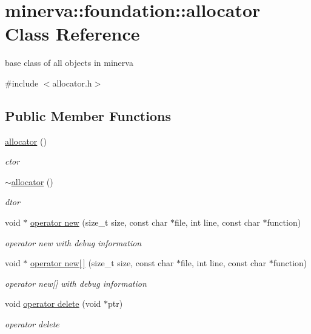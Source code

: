 \hypertarget{classminerva_1_1foundation_1_1allocator}{}\section{minerva\+:\+:foundation\+:\+:allocator Class Reference}
\label{classminerva_1_1foundation_1_1allocator}


base class of all objects in minerva  




{\ttfamily \#include $<$allocator.\+h$>$}

\subsection*{Public Member Functions}
\begin{DoxyCompactItemize}
\item 
\mbox{\label{classminerva_1_1foundation_1_1allocator_a1d984a6c7360cac43c6182fc8c27f263}} 
\hyperlink{classminerva_1_1foundation_1_1allocator_a1d984a6c7360cac43c6182fc8c27f263}{allocator} ()
\begin{DoxyCompactList}\small\item\em ctor \end{DoxyCompactList}\item 
\mbox{\label{classminerva_1_1foundation_1_1allocator_a1818227b868a680283eb08fbaf2abec9}} 
\hyperlink{classminerva_1_1foundation_1_1allocator_a1818227b868a680283eb08fbaf2abec9}{$\sim$allocator} ()
\begin{DoxyCompactList}\small\item\em dtor \end{DoxyCompactList}\item 
void $\ast$ \hyperlink{classminerva_1_1foundation_1_1allocator_af693b0cd3bdec3bfdc4885b15f9d04c6}{operator new} (size\+\_\+t size, const char $\ast$file, int line, const char $\ast$function)
\begin{DoxyCompactList}\small\item\em operator new with debug information \end{DoxyCompactList}\item 
void $\ast$ \hyperlink{classminerva_1_1foundation_1_1allocator_a19f76fd74546cc86283694836b55570b}{operator new\mbox{[}$\,$\mbox{]}} (size\+\_\+t size, const char $\ast$file, int line, const char $\ast$function)
\begin{DoxyCompactList}\small\item\em operator new\mbox{[}\mbox{]} with debug information \end{DoxyCompactList}\item 
void \hyperlink{classminerva_1_1foundation_1_1allocator_ae33b6c28ecbd236c7e974ac9270601a8}{operator delete} (void $\ast$ptr)
\begin{DoxyCompactList}\small\item\em operator delete \end{DoxyCompactList}\end{DoxyCompactItemize}


